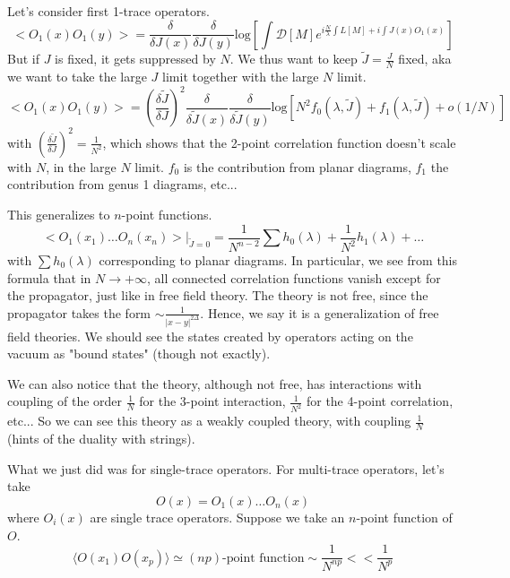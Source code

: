 \documentclass[a4paper]{book}
\theoremstyle{definition}
\theoremstyle{remark}
\begin{document}
Let's consider first 1-trace operators. 
\begin{equation}
    <O_1(x)O_1(y)> = \frac{\delta}{\delta J(x)} \frac{\delta}{\delta J(y)}\text{log}\left[\int \mathcal D [M] e^{i\frac{N}{\lambda}\int L[M] + i \int J(x) O_1(x) }\right]
\end{equation}
But if $J$ is fixed, it gets suppressed by $N$. We thus want to keep $\tilde{J} = \frac{J}{N}$ fixed, aka we want to take the large $J$ limit together with the large $N$ limit. 
\begin{equation}
    <O_1(x)O_1(y)> =\left(\frac{\delta \tilde J}{\delta J}\right)^2 \frac{\delta}{\delta \tilde J(x)} \frac{\delta}{\delta\tilde  J(y)}\text{log}\left[ N^2 f_0(\lambda, \tilde J) + f_1(\lambda, \tilde J) + o(1/N)\right]
\end{equation}
with $\left(\frac{\delta \tilde J}{\delta J}\right)^2 = \frac{1}{N^2}$, which shows that the 2-point correlation function doesn't scale with $N$, in the large $N$ limit. $f_0$ is the contribution from planar diagrams, $f_1$ the contribution from genus 1 diagrams, etc...\par \medskip 

This generalizes to $n$-point functions. 
\begin{equation}
    <O_1(x_1)\dots O_n(x_n)> \Big|_{\tilde{J} = 0} = \frac{1}{N^{n-2}} \sum h_0(\lambda) + \frac{1}{N^2} h_1(\lambda) + \dots 
\end{equation}
with $\sum h_0(\lambda)$ corresponding to planar diagrams. In particular, we see from this formula that in $N\rightarrow +\infty$, all connected correlation functions vanish except for the propagator, just like in free field theory. The theory is not free, since the propagator takes the form $\sim \frac{1}{|x-y|^{2\Delta}}$. Hence, we say it is a generalization of free field theories. We should see the states created by operators acting on the vacuum as "bound states" (though not exactly). \par \medskip

We can also notice that the theory, although not free, has interactions with coupling of the order $\frac{1}{N}$ for the 3-point interaction, $\frac{1}{N^2}$ for the 4-point correlation, etc... So we can see this theory as a weakly coupled theory, with coupling $\frac{1}{N}$ (hints of the duality with strings). \par \medskip 

What we just did was for single-trace operators. For multi-trace operators, let's take 
\begin{equation}
    O(x) = O_1(x)\dots O_n(x)
\end{equation}
where $O_i(x)$ are single trace operators. Suppose we take an $n$-point function of $O$. 
\begin{equation}
    \langle O(x_1)O(x_p)\rangle \simeq (np)\text{-point function} \sim \frac{1}{N^{np}} << \frac{1}{N^p}
\end{equation}
\end{document}
